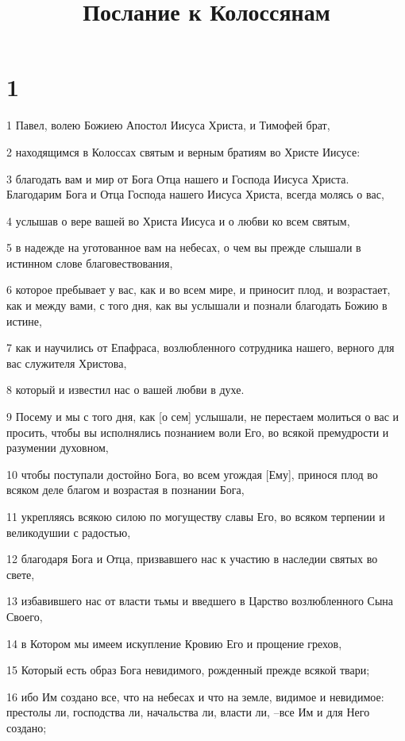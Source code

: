 

\title{Послание к Колоссянам}


\chapter{1}

\par 1 Павел, волею Божиею Апостол Иисуса Христа, и Тимофей брат,
\par 2 находящимся в Колоссах святым и верным братиям во Христе Иисусе:
\par 3 благодать вам и мир от Бога Отца нашего и Господа Иисуса Христа. Благодарим Бога и Отца Господа нашего Иисуса Христа, всегда молясь о вас,
\par 4 услышав о вере вашей во Христа Иисуса и о любви ко всем святым,
\par 5 в надежде на уготованное вам на небесах, о чем вы прежде слышали в истинном слове благовествования,
\par 6 которое пребывает у вас, как и во всем мире, и приносит плод, и возрастает, как и между вами, с того дня, как вы услышали и познали благодать Божию в истине,
\par 7 как и научились от Епафраса, возлюбленного сотрудника нашего, верного для вас служителя Христова,
\par 8 который и известил нас о вашей любви в духе.
\par 9 Посему и мы с того дня, как [о сем] услышали, не перестаем молиться о вас и просить, чтобы вы исполнялись познанием воли Его, во всякой премудрости и разумении духовном,
\par 10 чтобы поступали достойно Бога, во всем угождая [Ему], принося плод во всяком деле благом и возрастая в познании Бога,
\par 11 укрепляясь всякою силою по могуществу славы Его, во всяком терпении и великодушии с радостью,
\par 12 благодаря Бога и Отца, призвавшего нас к участию в наследии святых во свете,
\par 13 избавившего нас от власти тьмы и введшего в Царство возлюбленного Сына Своего,
\par 14 в Котором мы имеем искупление Кровию Его и прощение грехов,
\par 15 Который есть образ Бога невидимого, рожденный прежде всякой твари;
\par 16 ибо Им создано все, что на небесах и что на земле, видимое и невидимое: престолы ли, господства ли, начальства ли, власти ли, --все Им и для Него создано;
